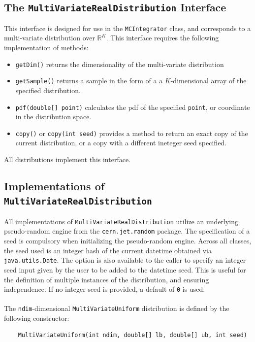 \subsection*{The \texttt{MultiVariateRealDistribution} Interface}
This interface is designed for use in the \texttt{MCIntegrator} class, and corresponds to a multi-variate distribution over \(\mathbb{R}^K\). This interface requires the following implementation of methods:
\begin{itemize}[noitemsep]
    \item \texttt{getDim()} returns the dimensionality of the multi-variate distribution
    \item \texttt{getSample()} returns a sample in the form of a a \(K\)-dimensional array of the specified distribution.
    \item \texttt{pdf(double[] point)} calculates the pdf of the specified \texttt{point}, or coordinate in the distribution space.
    \item \texttt{copy()} or \texttt{copy(int seed)} provides a method to return an exact copy of the current distribution, or a copy with a different ineteger seed specified. 
\end{itemize}
All distributions implement this interface.

\subsection*{Implementations of \texttt{MultiVariateRealDistribution}}
All implementations of \texttt{MultiVariateRealDistribution} utilize an underlying pseudo-random engine from the \texttt{cern.jet.random} package. The specification of a seed is compulsory when initializing the pseudo-random engine. Across all classes, the seed used is an integer hash of the current datetime obtained via \texttt{java.utils.Date}. The option is also available to the caller to specify an integer seed input given by the user to be added to the datetime seed. This is useful for the definition of multiple instances of the distribution, and ensuring independence. If no integer seed is provided, a default of \texttt{0} is used.
\\\\
The \texttt{ndim}-dimensional \texttt{MultiVariateUniform} distribution is defined by the following constructor:
\begin{lstlisting}
    MultiVariateUniform(int ndim, double[] lb, double[] ub, int seed)
\end{lstlisting}

